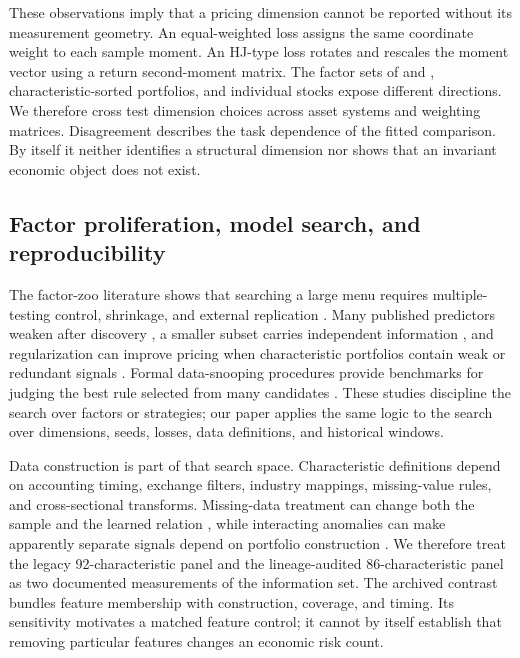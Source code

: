 These observations imply that a pricing dimension cannot be reported without its measurement geometry. An equal-weighted loss assigns the same coordinate weight to each sample moment. An HJ-type loss rotates and rescales the moment vector using a return second-moment matrix. The factor sets of \citet{fama1993common} and \citet{fama2015five}, characteristic-sorted portfolios, and individual stocks expose different directions. We therefore cross test dimension choices across asset systems and weighting matrices. Disagreement describes the task dependence of the fitted comparison. By itself it neither identifies a structural dimension nor shows that an invariant economic object does not exist.

\subsection{Factor proliferation, model search, and reproducibility}

The factor-zoo literature shows that searching a large menu requires multiple-testing control, shrinkage, and external replication \citep{harvey2016cross,feng2020taming,hou2020replicating}. Many published predictors weaken after discovery \citep{mclean2016destroy}, a smaller subset carries independent information \citep{green2017characteristics}, and regularization can improve pricing when characteristic portfolios contain weak or redundant signals \citep{kozak2020shrinking}. Formal data-snooping procedures provide benchmarks for judging the best rule selected from many candidates \citep{white2000reality,hansen2005spa,romano2005stepwise}. These studies discipline the search over factors or strategies; our paper applies the same logic to the search over dimensions, seeds, losses, data definitions, and historical windows.

Data construction is part of that search space. Characteristic definitions depend on accounting timing, exchange filters, industry mappings, missing-value rules, and cross-sectional transforms. Missing-data treatment can change both the sample and the learned relation \citep{freyberger2025missing}, while interacting anomalies can make apparently separate signals depend on portfolio construction \citep{muller2025interacting}. We therefore treat the legacy 92-characteristic panel and the lineage-audited 86-characteristic panel as two documented measurements of the information set. The archived contrast bundles feature membership with construction, coverage, and timing. Its sensitivity motivates a matched feature control; it cannot by itself establish that removing particular features changes an economic risk count.

